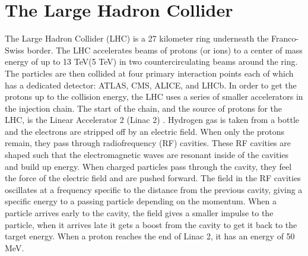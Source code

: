 \section{The Large Hadron Collider}
The Large Hadron Collider (LHC) is a 27 kilometer ring underneath the Franco-Swiss border. The LHC accelerates beams of protons (or ions) to a center of mass energy of up to 13 TeV(5 TeV) in two countercirculating beams around the ring. The particles are then collided at four primary interaction points each of which has a dedicated detector: ATLAS, CMS, ALICE, and LHCb.\newline
\indent In order to get the protons up to the collision energy, the LHC uses a series of smaller accelerators in the injection chain. The start of the chain, and the source of protons for the LHC, is the Linear Accelerator 2 (Linac 2) \cite{accelerator:1997427}. Hydrogen gas is taken from a bottle and the electrons are stripped off by an electric field. When only the protons remain, they pass through radiofrequency (RF) cavities. These RF cavities are shaped such that the electromagnetic waves are resonant inside of the cavities and build up energy. When charged particles pass through the cavity, they feel the force of the electric field and are pushed forward. The field in the RF cavities oscillates at a frequency specific to the distance from the previous cavity, giving a specific energy to a passing particle depending on the momentum. When a particle arrives early to the cavity, the field gives a smaller impulse to the particle, when it arrives late it gets a boost from the cavity to get it back to the target energy. When a proton reaches the end of Linac 2, it has an energy of 50 MeV.\newline


